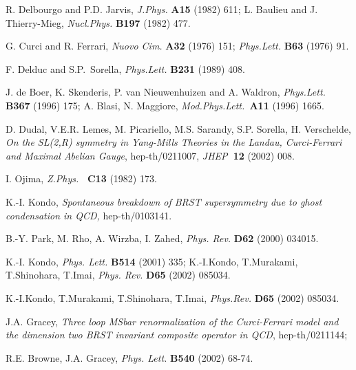 \documentclass[a4paper,12pt]{article}
\begin{document}
\begin{thebibliography}{99}
  R. Delbourgo and P.D. Jarvis, \emph{J.Phys. }\textbf{A15}
(1982) 611; L. Baulieu and J. Thierry-Mieg, \emph{Nucl.Phys. }\textbf{B197 }%
(1982) 477.

  G. Curci and R. Ferrari, \emph{Nuovo Cim. }\textbf{A32} (1976)
151; \emph{Phys.Lett. }\textbf{B63} (1976) 91.

  F. Delduc and S.P.\ Sorella, \emph{Phys.Lett. }\textbf{B231}
(1989) 408.

  J. de Boer, K. Skenderis, P. van Nieuwenhuizen and A. Waldron, 
\emph{Phys.Lett. }\textbf{B367} (1996) 175; A. Blasi, N. Maggiore, \emph{%
Mod.Phys.Lett.\ }\textbf{A11} (1996) 1665.

  D. Dudal, V.E.R. Lemes, M. Picariello, M.S. Sarandy, S.P.
Sorella, H. Verschelde, \emph{On the SL(2,R) symmetry in Yang-Mills Theories
in the Landau, Curci-Ferrari and Maximal Abelian Gauge}, hep-th/0211007, 
\emph{JHEP}\textbf{\ 12 }(2002) 008.

  I. Ojima, \emph{Z.Phys. }\textbf{\ C13} (1982) 173.

  K.-I. Kondo, \emph{Spontaneous breakdown of BRST supersymmetry
due to ghost condensation in QCD, }hep-th/0103141.

  B.-Y. Park, M. Rho, A. Wirzba, I. Zahed, \emph{Phys. Rev. }%
\textbf{D62} (2000) 034015.

  K.-I. Kondo, \emph{Phys. Lett.} \textbf{B514} (2001) 335;
K.-I.Kondo, T.Murakami, T.Shinohara, T.Imai, \emph{Phys. Rev.} \textbf{D65}
(2002) 085034.

  K.-I.Kondo, T.Murakami, T.Shinohara, T.Imai, \emph{Phys.Rev.} 
\textbf{D65} (2002) 085034.

  J.A. Gracey, \emph{Three loop MSbar renormalization of the
Curci-Ferrari model and the dimension two BRST invariant composite operator
in QCD}, hep-th/0211144;

R.E. Browne, J.A. Gracey, \emph{Phys. Lett.} \textbf{B540} (2002) 68-74.
\end{thebibliography}
\end{document}
